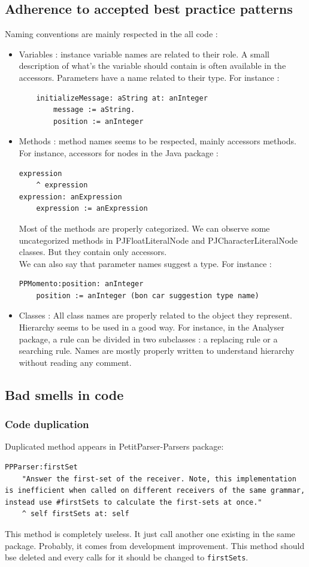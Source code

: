 \subsection{Adherence to accepted best practice patterns}
Naming conventions are mainly respected in the all code : 
\begin{itemize}
\item Variables : instance variable names are related to their role. A small description of what's the variable should contain is often available in the accessors. Parameters have a name related to their type. For instance :
\begin{lstlisting}
	initializeMessage: aString at: anInteger
		message := aString.
		position := anInteger
\end{lstlisting}
\item Methods : method names seems to be respected, mainly accessors methods. For instance, accessors for nodes in the Java package :
\begin{lstlisting}
expression
	^ expression
expression: anExpression
	expression := anExpression
\end{lstlisting}
Most of the methods are properly categorized. We can observe some uncategorized methods in PJFloatLiteralNode and PJCharacterLiteralNode classes. But they contain only accessors. \\
We can also say that parameter names suggest a type. For instance : 
\begin{lstlisting}
PPMomento:position: anInteger
    position := anInteger (bon car suggestion type name)
   \end{lstlisting}

\item Classes : All class names are properly related to the object they represent. Hierarchy seems to be used in a good way. For instance, in the Analyser package, a rule can be divided in two subclasses : a replacing rule or a searching rule. Names are mostly properly written to understand hierarchy without reading any comment.
\end{itemize}

\subsection{Bad smells in code}

\subsubsection{Code duplication}
Duplicated method appears in PetitParser-Parsers package: 
\begin{lstlisting}[breaklines]
PPParser:firstSet
    "Answer the first-set of the receiver. Note, this implementation is inefficient when called on different receivers of the same grammar, instead use #firstSets to calculate the first-sets at once."
    ^ self firstSets at: self
\end{lstlisting}
This method is completely useless. It just call another one existing in the same package. Probably, it comes from development improvement. This method should bse deleted and every calls for it should be changed to  \texttt{firstSets}.

